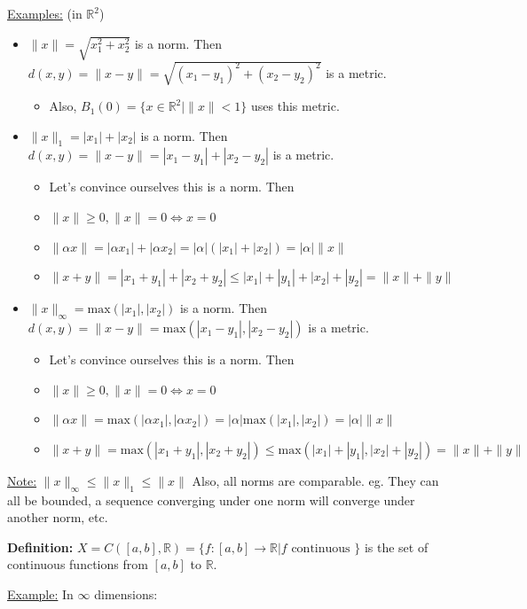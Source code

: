 \documentclass{article}
\newcommand*{\txt}[1]{\text{ #1 }}%
\newcommand*{\rr}{\mathbb{R}}%
\begin{document}
\underline{Examples:} (in $\rr^2$) \begin{itemize}
    \item $\|x\|=\sqrt{x_1^2+x_2^2}$ is a norm. Then $d(x,y)=\|x-y\|=\sqrt{(x_1-y_1)^2+(x_2-y_2)^2}$ is a metric.
    \begin{itemize}
        \item Also, $B_1(0)=\{x\in \rr^2|\|x\|<1\}$ uses this metric.
    \end{itemize}
    \item $\|x\|_1=|x_1|+|x_2|$ is a norm. Then $d(x,y)=\|x-y\|=|x_1-y_1|+|x_2-y_2|$ is a metric.
    \begin{itemize}
        \item Let's convince ourselves this is a norm. Then 
        \item $\|x\|\geq 0, \|x\|=0\iff x=0$
        \item $\|\alpha x\|=|\alpha x_1|+|\alpha x_2|=|\alpha|(|x_1|+|x_2|)=|\alpha|\|x\|$
        \item $\|x+y\|=|x_1+y_1|+|x_2+y_2|\leq |x_1|+|y_1|+|x_2|+|y_2|=\|x\|+\|y\|$
    \end{itemize}
    \item $\|x\|_\infty=\text{max}(|x_1|,|x_2|)$ is a norm. Then $d(x,y)=\|x-y\|=\text{max}(|x_1-y_1|,|x_2-y_2|)$ is a metric.
    \begin{itemize}
        \item Let's convince ourselves this is a norm. Then
        \item $\|x\|\geq 0, \|x\|=0\iff x=0$
        \item $\|\alpha x\|=\text{max}(|\alpha x_1|,|\alpha x_2|)=|\alpha|\text{max}(|x_1|,|x_2|)=|\alpha|\|x\|$
        \item $\|x+y\|=\text{max}(|x_1+y_1|,|x_2+y_2|)\leq \text{max}(|x_1|+|y_1|,|x_2|+|y_2|)=\|x\|+\|y\|$
    \end{itemize}
\end{itemize}

\underline{Note:} $\|x\|_\infty\leq \|x\|_1\leq \|x\|$ Also, all norms are comparable. eg. They can all be bounded, a sequence converging under one norm will converge under another norm, etc.

\textbf{Definition:} $X=C([a,b],\rr)=\{f:[a,b]\to\rr|f\txt{continuous}\}$ is the set of continuous functions from $[a,b]$ to $\rr$. 

\underline{Example:} In $\infty$ dimensions:
\end{document}
